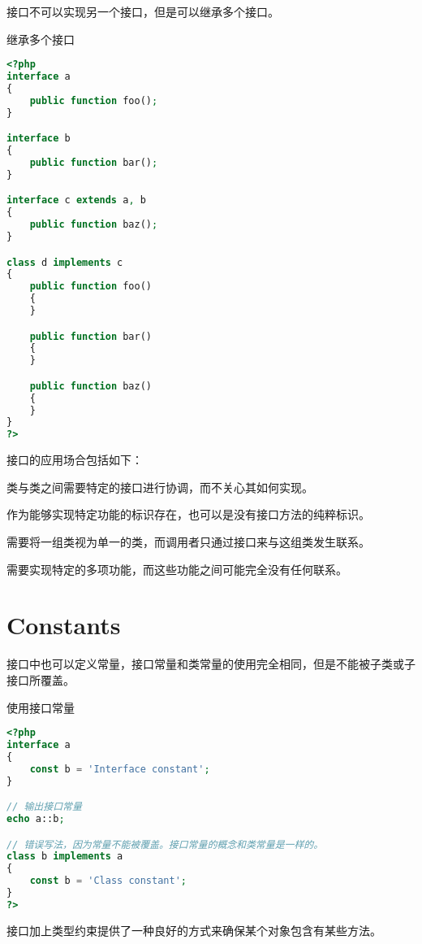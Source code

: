 接口不可以实现另一个接口，但是可以继承多个接口。

\begin{example}
继承多个接口
\begin{lstlisting}[language=PHP]
<?php
interface a
{
    public function foo();
}

interface b
{
    public function bar();
}

interface c extends a, b
{
    public function baz();
}

class d implements c
{
    public function foo()
    {
    }

    public function bar()
    {
    }

    public function baz()
    {
    }
}
?>
\end{lstlisting}
\end{example}

接口的应用场合包括如下：

\begin{compactenum}
\item 类与类之间需要特定的接口进行协调，而不关心其如何实现。
\item 作为能够实现特定功能的标识存在，也可以是没有接口方法的纯粹标识。
\item 需要将一组类视为单一的类，而调用者只通过接口来与这组类发生联系。
\item 需要实现特定的多项功能，而这些功能之间可能完全没有任何联系。
\end{compactenum}




\section{Constants}


接口中也可以定义常量，接口常量和类常量的使用完全相同，但是不能被子类或子接口所覆盖。





\begin{example}
使用接口常量
\begin{lstlisting}[language=PHP]
<?php
interface a
{
    const b = 'Interface constant';
}

// 输出接口常量
echo a::b;

// 错误写法，因为常量不能被覆盖。接口常量的概念和类常量是一样的。
class b implements a
{
    const b = 'Class constant';
}
?>
\end{lstlisting}
\end{example}

接口加上类型约束提供了一种良好的方式来确保某个对象包含有某些方法。



